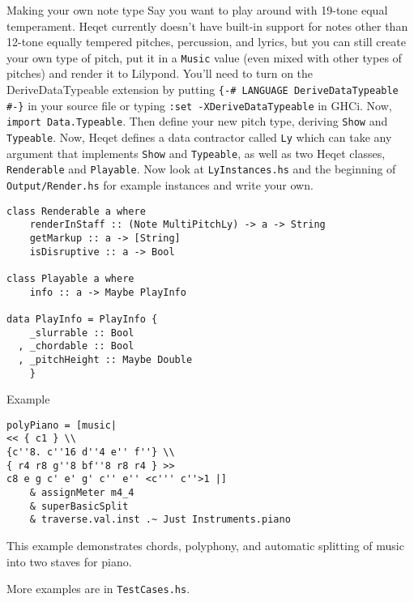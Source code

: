 \documentclass{article}
\begin{document}
\begin{section}{Making your own note type}
Say you want to play around with 19-tone equal temperament. Heqet currently doesn't have built-in support for notes other than 12-tone equally tempered pitches, percussion, and lyrics, but you can still create your own type of pitch, put it in a \verb+Music+ value (even mixed with other types of pitches) and render it to Lilypond. You'll need to turn on the DeriveDataTypeable extension by putting 
\verb+{-# LANGUAGE DeriveDataTypeable #-}+ in your source file or typing \verb+:set -XDeriveDataTypeable+ in GHCi. Now, \verb+import Data.Typeable+. Then define your new pitch type, deriving \verb+Show+ and \verb+Typeable+. Now, Heqet defines a data contractor called \verb+Ly+ which can take any argument that implements \verb+Show+ and \verb+Typeable+, as well as two Heqet classes, \verb+Renderable+ and \verb+Playable+. Now look at \verb+LyInstances.hs+ and the beginning of \verb+Output/Render.hs+ for example instances and write your own.

\begin{verbatim}
class Renderable a where
    renderInStaff :: (Note MultiPitchLy) -> a -> String
    getMarkup :: a -> [String]
    isDisruptive :: a -> Bool

class Playable a where
    info :: a -> Maybe PlayInfo

data PlayInfo = PlayInfo {
    _slurrable :: Bool
  , _chordable :: Bool
  , _pitchHeight :: Maybe Double
    }
\end{verbatim}

\end{section}
\begin{section}{Example}
\begin{verbatim}
polyPiano = [music| 
<< { c1 } \\ 
{c''8. c''16 d''4 e'' f''} \\ 
{ r4 r8 g''8 bf''8 r8 r4 } >> 
c8 e g c' e' g' c'' e'' <c''' c''>1 |]
    & assignMeter m4_4
    & superBasicSplit
    & traverse.val.inst .~ Just Instruments.piano
\end{verbatim}
This example demonstrates chords, polyphony, and automatic splitting of music into two staves for piano.

\begin{figure}
 \centering 
 
\end{figure}

More examples are in \verb+TestCases.hs+.

\end{section}
\end{document}
